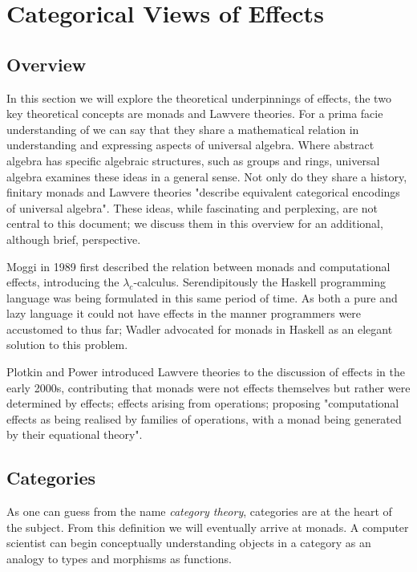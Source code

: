 \section{Categorical Views of Effects}

\subsection{Overview}
In this section we will explore the theoretical underpinnings of effects,
the two key theoretical concepts are monads and Lawvere theories.
For a prima facie understanding of we can say that
they share a mathematical relation in understanding and expressing aspects of universal algebra.
Where abstract algebra has specific algebraic structures, such as groups and rings,
universal algebra examines these ideas in a general sense.
Not only do they share a history, finitary monads and Lawvere theories
"describe equivalent categorical encodings of universal algebra"\cite{riehl}.
These ideas, while fascinating and perplexing,
are not central to this document;
we discuss them in this overview for an additional,
although brief, perspective.

Moggi in 1989 \cite{moggi1989computational}
first described the relation between monads and computational effects,
introducing the $\lambda_c$-calculus.
Serendipitously the Haskell programming language\cite{hudak1992report}
was being formulated in this same period of time.
As both a pure and lazy language
it could not have effects in the manner programmers were accustomed to thus far;
Wadler\cite{wadler1990} advocated for monads in Haskell as an elegant
solution to this problem.

Plotkin and Power \cite{Plotkin:2001jr}
introduced Lawvere theories to the discussion of effects
in the early 2000s,
contributing that monads were not effects themselves but rather were determined by effects;
effects arising from operations; proposing "computational effects as being realised by
families of operations, with a monad being generated by their equational theory"\cite{Plotkin:2002dw}.

\subsection{Categories}
As one can guess from the name \textit{category theory},
categories are at the heart of the subject.
From this definition we will eventually arrive at monads.
A computer scientist can begin conceptually
understanding objects in a category
as an analogy to types
and morphisms as functions.\\

